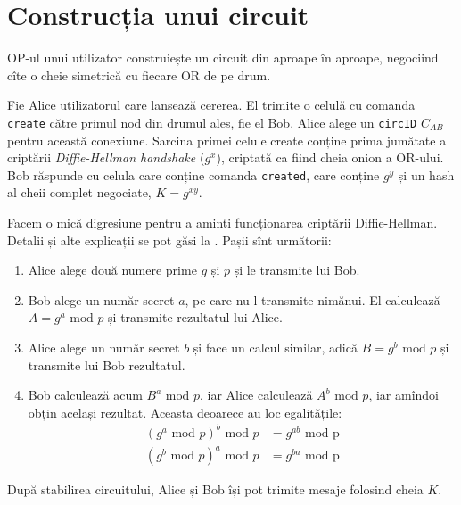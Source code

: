 
\section{Construcția unui circuit}

\indent\indent OP-ul unui utilizator construiește un circuit din aproape
în aproape, negociind cîte o cheie simetrică cu fiecare OR de pe drum.

Fie Alice utilizatorul care lansează cererea. El trimite o celulă cu
comanda \texttt{create} către primul nod din drumul ales, fie el Bob.
Alice alege un \texttt{circID} $C_{AB}$ pentru această conexiune.
Sarcina primei celule create conține prima jumătate a criptării
\emph{Diffie-Hellman handshake} ($g^x$), criptată ca fiind cheia onion
a OR-ului. Bob răspunde cu celula care conține comanda \texttt{created},
care conține $ g^y $ și un hash al cheii complet negociate, $ K = g^{xy} $.

\vspace{1cm}
Facem o mică digresiune pentru a aminti funcționarea criptării Diffie-Hellman.
Detalii și alte explicații se pot găsi la \cite{dhse}.
Pașii sînt următorii:
\begin{enumerate}[(1)]
  \item Alice alege două numere prime $ g $ și $ p $ și le transmite lui Bob.
  \item Bob alege un număr secret $ a $, pe care nu-l transmite nimănui.
    El calculează $ A = g^a \text{ mod } p $ și transmite rezultatul lui Alice.
  \item Alice alege un număr secret $ b $ și face un calcul similar,
    adică $ B = g^b \text{ mod } p $ și transmite lui Bob rezultatul.
  \item Bob calculează acum $ B^a \text{ mod } p $, iar Alice calculează
    $ A^b \text{ mod } p $, iar amîndoi obțin același rezultat.
    Aceasta deoarece au loc egalitățile:
    \begin{align*}
      (g^a \text{ mod } p)^b \text{ mod } p &= g^{ab} \text{ mod p} \\
      (g^b \text{ mod } p)^a \text{ mod } p &= g^{ba} \text{ mod p}
    \end{align*}
\end{enumerate}
\vspace{1cm}

După stabilirea circuitului, Alice și Bob își pot trimite mesaje folosind
cheia $ K $.

